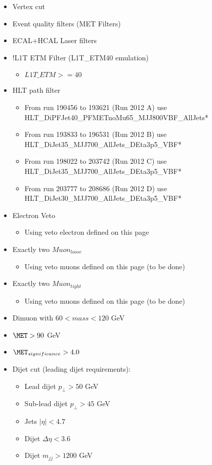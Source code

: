 \begin{itemize}
  \item Vertex cut
  \item Event quality filters (MET Filters)
  \item ECAL+HCAL Laser filters
  \item !L1T ETM Filter (L1T\_ETM40 emulation)
  \begin{itemize}
    \item $ L1T\_ETM >= 40 $
  \end{itemize}
  \item HLT path filter
  \begin{itemize}
    \item From run 190456 to 193621 (Run 2012 A) use HLT\_DiPFJet40\_PFMETnoMu65\_MJJ800VBF\_AllJets* 
    \item From run 193833 to 196531 (Run 2012 B) use HLT\_DiJet35\_MJJ700\_AllJets\_DEta3p5\_VBF*
    \item From run 198022 to 203742 (Run 2012 C) use HLT\_DiJet35\_MJJ700\_AllJets\_DEta3p5\_VBF*
    \item From run 203777 to 208686 (Run 2012 D) use HLT\_DiJet30\_MJJ700\_AllJets\_DEta3p5\_VBF*
  \end{itemize}
  \item Electron Veto
  \begin{itemize}
    \item Using veto electron defined on this page
  \end{itemize}
  \item Exactly two $Muon_{loose}$
  \begin{itemize}
    \item Using veto muons defined on this page (to be done)
  \end{itemize}
  \item Exactly two $Muon_{tight}$
  \begin{itemize}
    \item Using veto muons defined on this page (to be done)
  \end{itemize}
  \item Dimuon with $60<mass<120$ GeV
  \item $ \MET > 90 $ GeV
  \item $ \MET_{significance} > 4.0 $
  \item Dijet cut (leading dijet requirements):
  \begin{itemize}
    \item Lead dijet $ p_{\perp} > 50$ GeV
    \item Sub-lead dijet $ p_{\perp} > 45$ GeV
    \item Jets $ |\eta| < 4.7 $
    \item Dijet $ \Delta\eta < 3.6 $
    \item Dijet $ m_{jj} > 1200 $ GeV
  \end{itemize}
\end{itemize}
  
